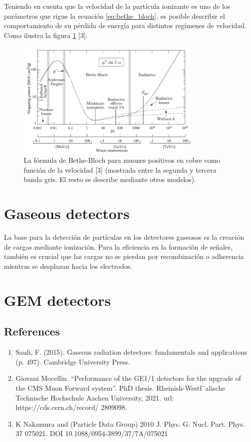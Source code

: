 \documentclass[]{book}
\begin{document}
\noindent Teniendo en cuenta que la velocidad de la partícula ionizante es uno de los parámetros que rigue la ecuación \ref{eq:bethe_bloch}, es posible describir el comportamiento de su pérdida de energía para distintos regímenes de velocidad. Como ilustra la figura \ref{fig:bethe_b} [3].

\begin{figure}[h]
    \centering
    \includegraphics[width=0.8\textwidth]{bethe_bloch.PNG}
    \caption{La fórmula de Bethe-Bloch para muones positivos en cobre como función de la velocidad [3] (mostrada entre la segunda y tercera banda gris. El resto se describe mediante otros modelos).}
    \label{fig:bethe_b}

\end{figure}

\section{Gaseous detectors}

\noindent La base para la detección de partículas en los detectores gaseosos es la creación de cargas mediante ionización. Para la eficiencia en la formación de señales, también es crucial que las cargas no se pierdan por recombinación o adherencia mientras se desplazan hacia los electrodos.

\section{GEM detectors}

\subsection*{References}
\begin{enumerate}
    \item Sauli, F. (2015). Gaseous radiation detectors: fundamentals and applications (p. 497). Cambridge University Press.
    \item Giovani Mocellin. “Performance of the GE1/1 detectors for the upgrade of the
    CMS Muon Forward system”. PhD thesis. Rheinish-Westf¨alische Technische
    Hochschule Aachen University, 2021. url: https://cds.cern.ch/record/
    2809098.
    \item K Nakamura and (Particle Data Group) 2010 J. Phys. G: Nucl. Part. Phys. 37 075021. DOI 10.1088/0954-3899/37/7A/075021
\end{enumerate}
\end{document}
